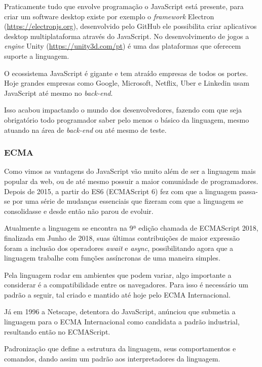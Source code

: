 \documentclass[
	12pt,				%
	openright,			%
	twoside,			%
	a4paper,			%
	english,			%
	brazil				%
	]{abntex2}
\begin{document}
Praticamente tudo que envolve programação o JavaScript está presente, para criar um software desktop existe por exemplo o \textit{framework} Electron (\href{https://electronjs.org}{https://electronjs.org}), desenvolvido pelo GitHub ele possibilita criar aplicativos desktop multiplataforma através do JavaScript. No desenvolvimento de jogos a \textit{engine} Unity (\href{https://unity3d.com/pt}{https://unity3d.com/pt}) é uma das plataformas que oferecem suporte a linguagem.

O ecossistema JavaScript é gigante e tem atraído empresas de todos os portes. Hoje grandes empresas como Google, Microsoft, Netflix, Uber e Linkedin usam JavaScript até mesmo no \textit{back-end}. 

Isso acabou impactando o mundo dos desenvolvedores, fazendo com que seja obrigatório todo programador saber pelo menos o básico da linguagem, mesmo atuando na área de \textit{back-end} ou até mesmo de teste.

\subsubsection{ECMA}

Como vimos as vantagens do JavaScript vão muito além de ser a linguagem mais popular da web, ou de até mesmo possuir a maior comunidade de programadores. Depois de 2015, a partir do ES6 (ECMAScript 6) fez com que a linguagem passa-se por uma série de mudanças essenciais que fizeram com que a linguagem se consolidasse e desde então não parou de evoluir.

Atualmente a linguagem se encontra na 9ª edição chamada de ECMAScript 2018, finalizada em Junho de 2018, suas últimas contribuições de maior expressão foram a inclusão dos operadores \textit{await} e \textit{async}, possibilitando agora que a linguagem trabalhe com funções assíncronas de uma maneira simples.

Pela linguagem rodar em ambientes que podem variar, algo importante a considerar é a compatibilidade entre os navegadores. Para isso é necessário um padrão a seguir, tal criado e mantido até hoje pelo ECMA Internacional.

Já em 1996 a Netscape, detentora do JavaScript, anúnciou que submetia a linguagem para o ECMA Internacional como candidata a padrão industrial, resultando então no ECMAScript.

Padronização que define a estrutura da linguagem, seus comportamentos e comandos, dando assim um padrão aos interpretadores da linguagem. 
\end{document}
